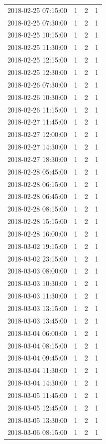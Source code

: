 \begin{tabular}{lrrr}
2018-02-25 07:15:00 & 1 & 2 & 1 \\
2018-02-25 07:30:00 & 1 & 2 & 1 \\
2018-02-25 10:15:00 & 1 & 2 & 1 \\
2018-02-25 11:30:00 & 1 & 2 & 1 \\
2018-02-25 12:15:00 & 1 & 2 & 1 \\
2018-02-25 12:30:00 & 1 & 2 & 1 \\
2018-02-26 07:30:00 & 1 & 2 & 1 \\
2018-02-26 10:30:00 & 1 & 2 & 1 \\
2018-02-26 11:15:00 & 1 & 2 & 1 \\
2018-02-27 11:45:00 & 1 & 2 & 1 \\
2018-02-27 12:00:00 & 1 & 2 & 1 \\
2018-02-27 14:30:00 & 1 & 2 & 1 \\
2018-02-27 18:30:00 & 1 & 2 & 1 \\
2018-02-28 05:45:00 & 1 & 2 & 1 \\
2018-02-28 06:15:00 & 1 & 2 & 1 \\
2018-02-28 06:45:00 & 1 & 2 & 1 \\
2018-02-28 08:15:00 & 1 & 2 & 1 \\
2018-02-28 15:15:00 & 1 & 2 & 1 \\
2018-02-28 16:00:00 & 1 & 2 & 1 \\
2018-03-02 19:15:00 & 1 & 2 & 1 \\
2018-03-02 23:15:00 & 1 & 2 & 1 \\
2018-03-03 08:00:00 & 1 & 2 & 1 \\
2018-03-03 10:30:00 & 1 & 2 & 1 \\
2018-03-03 11:30:00 & 1 & 2 & 1 \\
2018-03-03 13:15:00 & 1 & 2 & 1 \\
2018-03-03 13:45:00 & 1 & 2 & 1 \\
2018-03-04 06:00:00 & 1 & 2 & 1 \\
2018-03-04 08:15:00 & 1 & 2 & 1 \\
2018-03-04 09:45:00 & 1 & 2 & 1 \\
2018-03-04 11:30:00 & 1 & 2 & 1 \\
2018-03-04 14:30:00 & 1 & 2 & 1 \\
2018-03-05 11:45:00 & 1 & 2 & 1 \\
2018-03-05 12:45:00 & 1 & 2 & 1 \\
2018-03-05 13:30:00 & 1 & 2 & 1 \\
2018-03-06 08:15:00 & 1 & 2 & 1 \\

\end{tabular}

